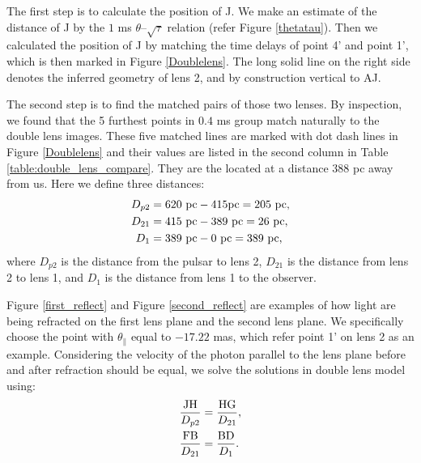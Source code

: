 \documentclass[useAMS,usenatbib]{mn2e}
\begin{document}

The first step is to calculate the position of J. We make an estimate of the distance of J by the $1$ ms $\theta$--$\sqrt{\tau}$ relation (refer Figure \ref{thetatau}). Then we calculated the position of J by matching the time delays of point 4' and point 1', which is then marked in Figure \ref{Doublelens}. The long solid line on the right side denotes the inferred geometry of lens 2, and by construction vertical to AJ.

The second step is to find the matched pairs of those two lenses. By inspection, we found that the 5 furthest points in $0.4$ ms group match naturally to the double lens images. These five matched lines are marked with dot dash lines in Figure \ref{Doublelens} and their values are listed in the second column in Table \ref{table:double_lens_compare}. 
They are the located at a distance $388$ pc away from us. Here we define three distances:
\begin{equation}
\begin{aligned}
D_{p2}&=620~{\rm pc}-415{\rm pc} =205~{\rm pc},\\
D_{21}&=415~{\rm pc}-389~{\rm pc} =26~{\rm pc},\\
D_{1}&=389~{\rm pc}- 0~{\rm pc} = 389~{\rm pc}, 
\end{aligned} 
\end{equation}
where $D_{p2}$ is the distance from the pulsar to lens 2, $D_{21}$ is the distance from lens 2 to lens 1, and $D_{1}$ is the distance from lens 1 to the observer.

Figure \ref{first_reflect} and Figure \ref{second_reflect} are examples of how light are being refracted on the first lens plane and the second lens plane. We specifically choose the point with $\theta_{\parallel}$ equal to $-17.22$ mas, which refer point 1' on lens 2 as an example. Considering the velocity of the photon parallel to the lens plane before and after refraction should be equal, we solve the solutions in double lens model using:
\begin{equation}
\begin{aligned}
\frac{\rm JH}{D_{p2}}&=\frac{\rm HG}{D_{21}},\\
\frac{\rm FB}{D_{21}}&=\frac{\rm BD}{D_{1}}.
\end{aligned}
\end{equation}
\end{document}
